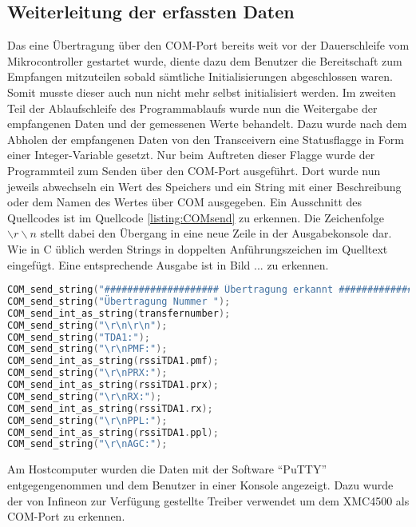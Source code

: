


\subsection{Weiterleitung der erfassten Daten}
Das eine Übertragung über den COM-Port bereits weit vor der Dauerschleife vom Mikrocontroller gestartet wurde, diente dazu dem Benutzer  die Bereitschaft zum Empfangen mitzuteilen sobald sämtliche Initialisierungen abgeschlossen waren. Somit musste dieser auch nun nicht mehr selbst initialisiert werden.
Im zweiten Teil der Ablaufschleife des Programmablaufs wurde nun die Weitergabe der empfangenen Daten und der gemessenen Werte behandelt. Dazu wurde nach dem Abholen der empfangenen Daten von den Transceivern eine Statusflagge in Form einer Integer-Variable gesetzt. Nur beim Auftreten dieser Flagge wurde der Programmteil zum Senden über den COM-Port ausgeführt.
Dort wurde nun jeweils abwechseln ein Wert des Speichers und ein String mit einer Beschreibung oder dem Namen des Wertes über COM ausgegeben. Ein Ausschnitt des Quellcodes ist im Quellcode \ref{listing:COMsend} zu erkennen. Die Zeichenfolge $\backslash r\backslash n$ stellt dabei den Übergang in eine neue Zeile in der Ausgabekonsole dar. Wie in C üblich werden Strings in doppelten Anführungszeichen im Quelltext eingefügt. Eine entsprechende Ausgabe ist in Bild ... zu erkennen. %
\begin{lstlisting}[caption={Ausschnitt aus dem Senden der Daten über den COM-Port},label={listing:COMsend},captionpos=b,language=C]
COM_send_string("#################### Übertragung erkannt ####################\r\n");
COM_send_string("Übertragung Nummer ");
COM_send_int_as_string(transfernumber);
COM_send_string("\r\n\r\n");
COM_send_string("TDA1:");
COM_send_string("\r\nPMF:");
COM_send_int_as_string(rssiTDA1.pmf);
COM_send_string("\r\nPRX:");
COM_send_int_as_string(rssiTDA1.prx);
COM_send_string("\r\nRX:");
COM_send_int_as_string(rssiTDA1.rx);
COM_send_string("\r\nPPL:");
COM_send_int_as_string(rssiTDA1.ppl);
COM_send_string("\r\nAGC:");
\end{lstlisting}
Am Hostcomputer wurden die Daten mit der Software \enquote{PuTTY} entgegengenommen und dem Benutzer in einer Konsole angezeigt. Dazu wurde der von Infineon zur Verfügung gestellte Treiber verwendet um dem XMC4500 als COM-Port zu erkennen. %
